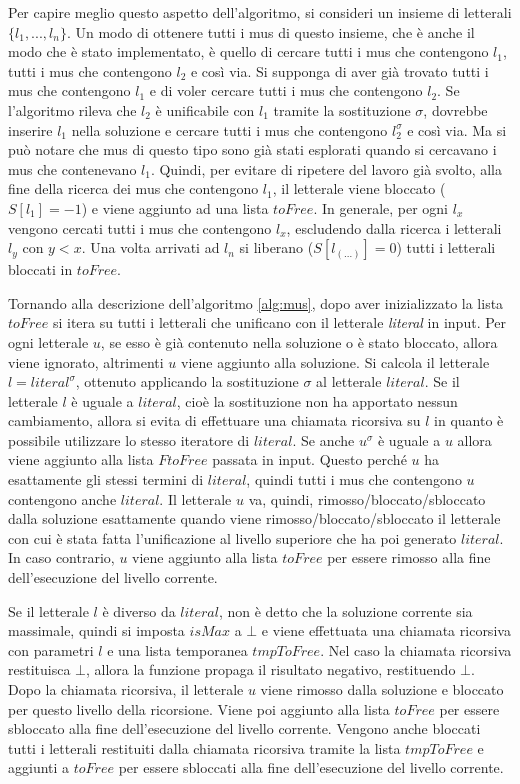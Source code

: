 \documentclass[./main.tex]{subfiles}
\begin{document}
Per capire meglio questo aspetto dell'algoritmo, si consideri un insieme di 
letterali $\{l_1, ... , l_n\}$. Un modo di ottenere tutti i mus di questo insieme,
che è anche il modo che è stato implementato,
è quello di cercare tutti i mus che contengono $l_1$, tutti i mus che contengono $l_2$ e così via.
Si supponga di aver già trovato tutti i mus che contengono $l_1$ e di 
voler cercare tutti i mus che contengono $l_2$. 
Se l'algoritmo rileva che $l_2$ è unificabile con $l_1$ tramite la sostituzione $\sigma$,
dovrebbe inserire $l_1$ nella soluzione e cercare tutti i mus
che contengono $l_2^\sigma$ e così via.
Ma si può notare che mus di questo tipo sono già stati esplorati quando 
si cercavano i mus che contenevano $l_1$.
Quindi, per evitare di ripetere del lavoro già svolto,
alla fine della ricerca dei mus che contengono $l_1$, il letterale viene
bloccato ($S[l_1] = -1$) e viene aggiunto ad una lista $toFree$.
In generale, per ogni $l_x$ vengono cercati tutti i mus che contengono $l_x$,
escludendo dalla ricerca i letterali $l_y$ con $y < x$.
Una volta arrivati ad $l_n$ si liberano ($S[l_{(...)}] = 0$) tutti i letterali bloccati in $toFree$.

Tornando alla descrizione dell'algoritmo \ref{alg:mus}, dopo aver inizializzato la lista $toFree$
si itera su tutti i letterali che unificano con il letterale \textit{literal} in input.
Per ogni letterale $u$, se esso è già contenuto nella soluzione o è stato bloccato, allora viene ignorato,
altrimenti $u$ viene aggiunto alla soluzione.
Si calcola il letterale $l = literal^\sigma$, ottenuto applicando la sostituzione
$\sigma$ al letterale $literal$. 
Se il letterale $l$ è uguale a $literal$, cioè la sostituzione non ha 
apportato nessun cambiamento, 
allora si evita di effettuare una chiamata ricorsiva su $l$ in quanto è possibile
utilizzare lo stesso iteratore di $literal$. 
Se anche $u^\sigma$ è uguale a $u$ allora viene aggiunto alla lista $FtoFree$ passata in input.
Questo perché $u$ ha esattamente gli stessi termini di $literal$, quindi tutti i mus che contengono $u$ contengono anche $literal$.
Il letterale $u$ va, quindi, rimosso/bloccato/sbloccato dalla soluzione esattamente quando viene rimosso/bloccato/sbloccato il letterale
con cui è stata fatta l'unificazione al livello superiore che ha poi generato $literal$.
In caso contrario, $u$ viene aggiunto alla lista $toFree$ per essere rimosso alla fine dell'esecuzione del livello corrente.

Se il letterale $l$ è diverso da $literal$, non è detto che la soluzione corrente sia massimale,
quindi si imposta $isMax$ a $\bot$ e viene effettuata una chiamata ricorsiva con parametri $l$
e una lista temporanea $tmpToFree$. 
Nel caso la chiamata ricorsiva restituisca $\bot$, allora la funzione propaga il risultato negativo, restituendo $\bot$.
Dopo la chiamata ricorsiva, il letterale $u$ viene rimosso dalla soluzione e bloccato per 
questo livello della ricorsione. Viene poi aggiunto alla lista $toFree$ per essere sbloccato 
alla fine dell'esecuzione del livello corrente.
Vengono anche bloccati tutti i letterali restituiti dalla chiamata ricorsiva tramite la lista $tmpToFree$ e aggiunti a $toFree$
per essere sbloccati alla fine dell'esecuzione del livello corrente.
\end{document}
